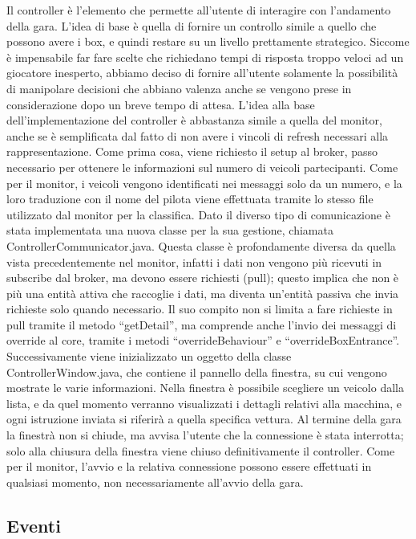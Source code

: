 Il controller è l’elemento che permette all’utente di interagire con l’andamento della gara. L’idea di base è quella di fornire un controllo simile a quello che possono avere i box, e quindi restare su un livello prettamente strategico.
Siccome è impensabile far fare scelte che richiedano tempi di risposta troppo veloci ad un giocatore inesperto, abbiamo deciso di fornire all’utente solamente la possibilità di manipolare decisioni che abbiano valenza anche se vengono prese in considerazione dopo un breve tempo di attesa.
L’idea alla base dell’implementazione del controller è abbastanza simile a quella del monitor, anche se è semplificata dal fatto di non avere i vincoli di refresh necessari alla rappresentazione.
Come prima cosa, viene richiesto il setup al broker, passo necessario per ottenere le informazioni sul numero di veicoli partecipanti. Come per il monitor, i veicoli vengono identificati nei messaggi solo da un numero, e la loro traduzione con il nome del pilota viene effettuata tramite lo stesso file utilizzato dal monitor per la classifica.
Dato il diverso tipo di comunicazione è stata implementata una nuova classe per la sua gestione, chiamata ControllerCommunicator.java. Questa classe è profondamente diversa da quella vista precedentemente nel monitor, infatti i dati non vengono più ricevuti in subscribe dal broker, ma devono essere richiesti (pull); questo implica che non è più una entità attiva che raccoglie i dati, ma diventa un’entità passiva che invia richieste solo quando necessario.
Il suo compito non si limita a fare richieste in pull tramite il metodo “getDetail”, ma comprende anche l’invio dei messaggi di override al core, tramite i metodi “overrideBehaviour” e “overrideBoxEntrance”.
Successivamente viene inizializzato un oggetto della classe ControllerWindow.java, che contiene il pannello della finestra, su cui vengono mostrate le varie informazioni.
Nella finestra è possibile scegliere un veicolo dalla lista, e da quel momento verranno visualizzati i dettagli relativi alla macchina, e ogni istruzione inviata si riferirà a quella specifica vettura.
Al termine della gara la finestrà non si chiude, ma avvisa l’utente che la connessione è stata interrotta; solo alla chiusura della finestra viene chiuso definitivamente il controller.
Come per il monitor, l’avvio e la relativa connessione possono essere effettuati in qualsiasi momento, non necessariamente all’avvio della gara.

\subsection{Eventi}

